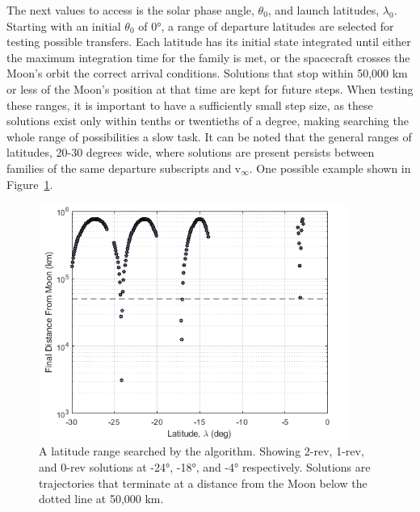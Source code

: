 \documentclass[letterpaper, paper,11pt]{AAS}	%
\begin{document}
The next values to access is the solar phase angle, \(\theta_0\), and launch latitudes, \(\lambda_0\). Starting with an initial \(\theta_0\) of 0°, a range of departure latitudes are selected for testing possible transfers. Each latitude has its initial state integrated until either the maximum integration time for the family is met, or the spacecraft crosses the Moon's orbit the correct arrival conditions. Solutions that stop within 50,000 km or less of the Moon's position at that time are kept for future steps. When testing these ranges, it is important to have a sufficiently small step size, as these solutions exist only within tenths or twentieths of a degree, making searching the whole range of possibilities a slow task. It can be noted that the general ranges of latitudes, 20-30 degrees wide, where solutions are present persists between families of the same departure subscripts and v\(_\infty\). One possible example shown in Figure~\ref{fig:latitudesearch}.

\begin{figure}[h!]
    \centering
    \includegraphics[width=4in]{./etc/latitudespace.png}
    \caption{A latitude range searched by the algorithm. Showing 2-rev, 1-rev, and 0-rev solutions at -24°, -18°, and -4° respectively. Solutions are trajectories that terminate at a distance from the Moon below the dotted line at 50,000 km.}
    \label{fig:latitudesearch}
\end{figure}
\end{document}
